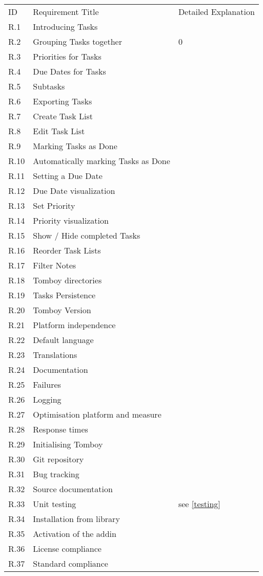 \begin{tabular}{lll}
ID  & Requirement Title   & Detailed Explanation	\\
R.1		& Introducing Tasks   & 						\\
R.2		& Grouping Tasks together & 0   \\
R.3		& Priorities for Tasks & \\
R.4		& Due Dates for Tasks & \\
R.5		& Subtasks & \\
\rowcolor{red}
R.6		& Exporting Tasks & \\
R.7		& Create Task List & \\
R.8		& Edit Task List & \\
R.9		& Marking Tasks as Done & \\
R.10	& Automatically marking Tasks as Done & \\
R.11	& Setting a Due Date & \\
R.12	& Due Date visualization & \\
R.13	& Set Priority & \\
R.14	& Priority visualization & \\
R.15	& Show / Hide completed Tasks & \\
R.16	& Reorder Task Lists & \\
R.17	& Filter Notes & \\
R.18	& Tomboy directories & \\
R.19	& Tasks Persistence & \\
R.20	& Tomboy Version & \\
R.21	& Platform independence & \\
R.22	& Default language & \\
R.23	& Translations & \\
R.24	& Documentation & \\
R.25	& Failures & \\
R.26	& Logging & \\
R.27	& Optimisation platform and measure & \\
R.28	& Response times & \\
R.29	& Initialising Tomboy & \\
R.30	& Git repository & \\
R.31	& Bug tracking & \\
R.32	& Source documentation & \\
\rowcolor{yellow}
R.33	& Unit testing & see \ref{testing}\\
R.34	& Installation from library & \\
R.35	& Activation of the addin & \\
R.36	& License compliance & \\
R.37	& Standard compliance & \\
\end{tabular}


